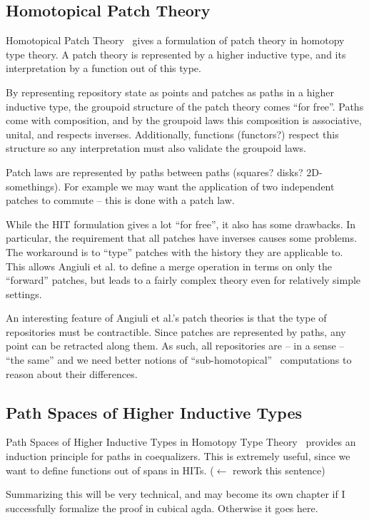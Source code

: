 \subsection{Homotopical Patch Theory}
Homotopical Patch Theory~\cite{Angiuli2016} gives a formulation of patch theory
in homotopy type theory. A patch theory is represented by a higher
inductive type, and its interpretation by a function out of this type.

By representing repository state as points and patches as paths in a higher
inductive type, the groupoid structure of the patch theory comes ``for free''.
Paths come with composition, and by the groupoid laws this composition is
associative, unital, and respects inverses. Additionally, functions (functors?)
respect this structure so any interpretation must also validate the groupoid
laws.

Patch laws are represented by paths between paths (squares? disks?
2D-somethings). For example we may want the application of two independent
patches to commute -- this is done with a patch law.

While the HIT formulation gives a lot ``for free'', it also has some drawbacks.
In particular, the requirement that all patches have inverses causes some
problems. The workaround is to ``type'' patches with the history they are
applicable to. This allows Angiuli et al. to define a merge operation in terms
on only the ``forward'' patches, but leads to a fairly complex theory even for
relatively simple settings.

An interesting feature of Angiuli et al.'s patch theories is that the type of
repositories must be contractible. Since patches are represented by paths, any
point can be retracted along them. As such, all repositories are -- in a sense
-- ``the same'' and we need better notions of
``sub-homotopical''~\cite{Angiuli2016} computations to reason about their differences.

\subsection{Path Spaces of Higher Inductive Types}
Path Spaces of Higher Inductive Types in Homotopy Type
Theory~\cite{kraus2019path} provides an induction principle for paths in
coequalizers. This is extremely useful, since we want to define functions out of
spans in HITs. ($\leftarrow$ rework this sentence)

Summarizing this will be very technical, and may become its own chapter if I
successfully formalize the proof in cubical agda. Otherwise it goes here.